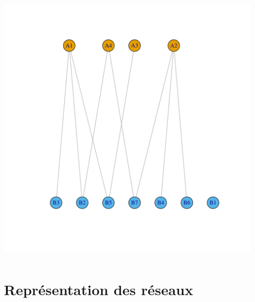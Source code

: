 \documentclass[nopagenumber,9pt]{beamer}
\begin{document}
\begin{frame}
\begin{columns}
\begin{column}{.3\paperwidth}
\includegraphics[scale=.25]{plots/graphe_bipartite.pdf}

\end{column}

\end{columns}



\end{frame}




\section{Représentation des réseaux}
\end{document}
